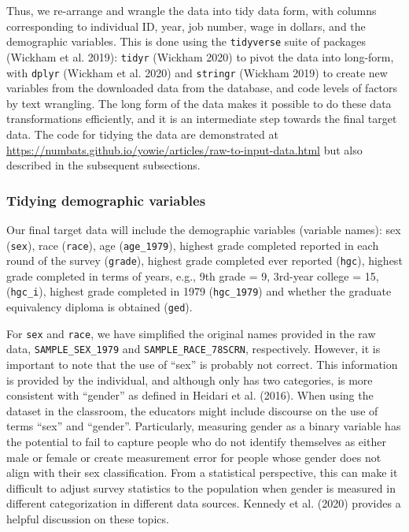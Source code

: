 \documentclass[12pt]{article}
\begin{document}
Thus, we re-arrange and wrangle the data into tidy data form, with columns corresponding to individual ID, year, job number, wage in dollars, and the demographic variables. This is done using the \texttt{tidyverse} suite of packages (Wickham et al. 2019): \texttt{tidyr} (Wickham 2020) to pivot the data into long-form, with \texttt{dplyr} (Wickham et al. 2020) and \texttt{stringr} (Wickham 2019) to create new variables from the downloaded data from the database, and code levels of factors by text wrangling. The long form of the data makes it possible to do these data transformations efficiently, and it is an intermediate step towards the final target data. The code for tidying the data are demonstrated at \url{https://numbats.github.io/yowie/articles/raw-to-input-data.html} but also described in the subsequent subsections.

\hypertarget{tidydemog}{%
\subsubsection{Tidying demographic variables}\label{tidydemog}}

Our final target data will include the demographic variables (variable names): sex (\texttt{sex}), race (\texttt{race}), age (\texttt{age\_1979}), highest grade completed reported in each round of the survey (\texttt{grade}), highest grade completed ever reported (\texttt{hgc}), highest grade completed in terms of years, e.g., 9th grade = 9, 3rd-year college = 15, (\texttt{hgc\_i}), highest grade completed in 1979 (\texttt{hgc\_1979}) and whether the graduate equivalency diploma is obtained (\texttt{ged}).

For \texttt{sex} and \texttt{race}, we have simplified the original names provided in the raw data, \texttt{SAMPLE\_SEX\_1979} and \texttt{SAMPLE\_RACE\_78SCRN}, respectively. However, it is important to note that the use of ``sex'' is probably not correct. This information is provided by the individual, and although only has two categories, is more consistent with ``gender'' as defined in Heidari et al. (2016). When using the dataset in the classroom, the educators might include discourse on the use of terms ``sex'' and ``gender''. Particularly, measuring gender as a binary variable has the potential to fail to capture people who do not identify themselves as either male or female or create measurement error for people whose gender does not align with their sex classification. From a statistical perspective, this can make it difficult to adjust survey statistics to the population when gender is measured in different categorization in different data sources. Kennedy et al. (2020) provides a helpful discussion on these topics.
\end{document}

